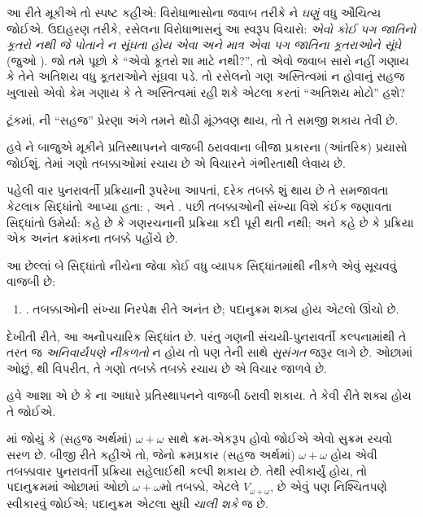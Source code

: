 આ રીતે મૂકીએ તો સ્પષ્ટ કહીએ: વિરોધાભાસોના જવાબ તરીકે
\limofsize{}ને \emph{ઘણું} વધુ ઔચિત્ય જોઈએ. ઉદાહરણ
તરીકે, રસેલના વિરોધાભાસનું આ સ્વરૂપ વિચારો:
\emph{એવો કોઈ પગ જાતિનો કૂતરો નથી જે પોતાને ન સૂંઘતા
હોય એવા અને માત્ર એવા પગ જાતિના કૂતરાઓને સૂંઘે}
(જુઓ ). જો તમે પૂછો કે
``એવો કૂતરો શા માટે નથી?'', તો એવો જવાબ સારો નહીં ગણાય
કે તેને અતિશય વધુ કૂતરાઓને સૂંઘવા પડે. તો રસેલનો
ગણ અસ્તિત્વમાં ન હોવાનું સહજ ખુલાસો એવો કેમ ગણાય કે
તે અસ્તિત્વમાં રહી શકે એટલા કરતાં ``અતિશય મોટો'' હશે?

ટૂંકમાં, \limofsize{}ની ``સહજ'' પ્રેરણા અંગે તમને
થોડી મૂંઝવણ થાય, તો તે સમજી શકાય તેવી છે.
\endgroup

\begingroup
\makeatletter{}\makeatother

\label{guunit:OLP-0570}


હવે \limofsize{}ને બાજુએ મૂકીને પ્રતિસ્થાપનને વાજબી
ઠરાવવાના બીજા પ્રકારના (આંતરિક) પ્રયાસો જોઈશું. તેમાં
ગણો તબક્કાઓમાં રચાય છે એ વિચારને ગંભીરતાથી લેવાય છે.

પહેલી વાર પુનરાવર્તી પ્રક્રિયાની રૂપરેખા આપતાં, દરેક
તબક્કે શું થાય છે તે સમજાવતા કેટલાક સિદ્ધાંતો આપ્યા
હતા: \stageshier, \stagesord અને \stagesacc. પછી
તબક્કાઓની સંખ્યા વિશે કંઈક જણાવતા સિદ્ધાંતો ઉમેર્યા:
\stagessucc{} કહે છે કે ગણરચનાની પ્રક્રિયા કદી પૂરી
થતી નથી; અને \stagesinf{} કહે છે કે પ્રક્રિયા એક
અનંત ક્રમાંકના તબક્કે પહોંચે છે.

આ છેલ્લાં બે સિદ્ધાંતો નીચેના જેવા કોઈ વધુ વ્યાપક
સિદ્ધાંતમાંથી નીકળે એવું સૂચવવું વાજબી છે:
\begin{enumerate}
	\item[] \stagesinex. તબક્કાઓની સંખ્યા નિરપેક્ષ રીતે
	અનંત છે; પદાનુક્રમ શક્ય હોય એટલો ઊંચો છે.
\end{enumerate}
દેખીતી રીતે, આ અનૌપચારિક સિદ્ધાંત છે. પરંતુ ગણની
સંચયી-પુનરાવર્તી કલ્પનામાંથી તે તરત જ \emph{અનિવાર્યપણે
નીકળતો} ન હોય તો પણ તેની સાથે \emph{સુસંગત} જરૂર
લાગે છે. ઓછામાં ઓછું, \limofsize{}થી વિપરીત, તે
ગણો તબક્કે તબક્કે રચાય છે એ વિચાર જાળવે છે.

હવે આશા એ છે કે \stagesinex{}ના આધારે પ્રતિસ્થાપનને
વાજબી ઠરાવી શકાય. તે કેવી રીતે શક્ય હોય તે જોઈએ.

માં જોયું કે (સહજ અર્થમાં)
$\omega+\omega$ સાથે ક્રમ-એકરૂપ હોવો જોઈએ એવો સુક્રમ
રચવો સરળ છે. બીજી રીતે કહીએ તો, જેનો ક્રમપ્રકાર
(સહજ અર્થમાં) $\omega+\omega$ હોય એવી તબક્કાવાર
પુનરાવર્તી પ્રક્રિયા સહેલાઈથી કલ્પી શકાય છે. તેથી
\stagesinex{} સ્વીકાર્યું હોય, તો પદાનુક્રમમાં ઓછામાં
ઓછો $\omega+\omega$મો તબક્કો, એટલે
$V_{\omega+\omega}$, છે એવું પણ નિશ્ચિતપણે સ્વીકારવું
જોઈએ; પદાનુક્રમ એટલા સુધી \emph{ચાલી શકે} જ છે.

